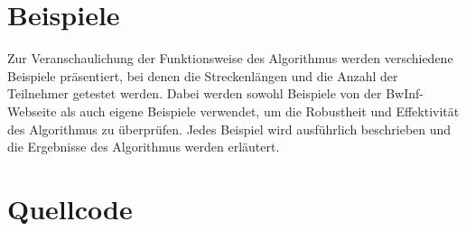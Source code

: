 \documentclass[a4paper,10pt,ngerman]{scrartcl}
\begin{document}
\section{Beispiele}

Zur Veranschaulichung der Funktionsweise des Algorithmus werden verschiedene Beispiele präsentiert, bei denen die Streckenlängen und die Anzahl der Teilnehmer getestet werden. Dabei werden sowohl Beispiele von der BwInf-Webseite als auch eigene Beispiele verwendet, um die Robustheit und Effektivität des Algorithmus zu überprüfen. Jedes Beispiel wird ausführlich beschrieben und die Ergebnisse des Algorithmus werden erläutert.

\section{Quellcode}


\end{document}
